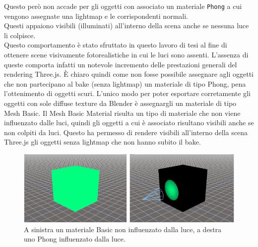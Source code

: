 Questo però non accade per gli oggetti con associato un materiale \texttt{Phong} a cui vengono assegnate una lightmap e le corrispondenti normali.
\\
Questi appaiono visibili (illuminati) all’interno della scena anche se nessuna luce li colpisce.
\\
Questo comportamento è stato sfruttato in questo lavoro di tesi al fine di ottenere scene visivamente fotorealistiche in cui le luci sono assenti. L’assenza di queste comporta infatti un notevole incremento delle prestazioni generali del rendering Three.js.
È chiaro quindi come non fosse possibile assegnare agli oggetti che non partecipano al bake (senza lightmap) un materiale di tipo Phong, pena l’ottenimento di oggetti scuri.
L’unico modo per poter esportare corretamente gli oggetti con sole diffuse texture da Blender è assegnargli un materiale di tipo Mesh Basic. 
Il Mesh Basic Material risulta un tipo di materiale che non viene influenzato dalle luci, quindi gli oggetti a cui è associato risultano visibili anche se non colpiti da luci.
Questo ha permesso di rendere visibili all’interno della scena Three.js gli oggetti senza lightmap che non hanno subito il bake.
\\
\begin{figure}[htb]
 \centering
 \includegraphics[width=1\linewidth]{images/chapter_baking_service/basic_phong.png}\hfill
 \caption[Differenza tra un materiale Basic ed uno Phong.]{A sinistra un materiale Basic non influenzato dalla luce, a destra uno Phong influenzato dalla luce.}
 \label{fig:baking_service_basic_phong}
\end{figure}

